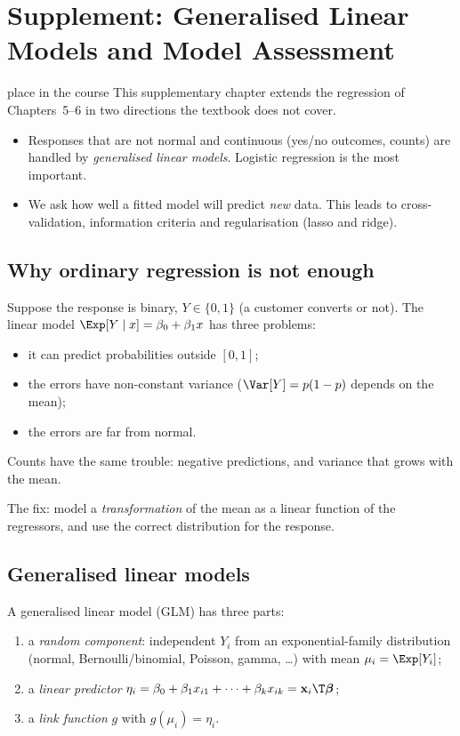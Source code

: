 \chapter{Supplement: Generalised Linear Models and Model Assessment}

\begin{nuance}{place in the course}
This supplementary chapter extends the regression of Chapters~5--6 in two directions the textbook does not cover.
\begin{itemize}
  \item Responses that are not normal and continuous (yes/no outcomes, counts) are handled by \emph{generalised linear models}. Logistic regression is the most important.
  \item We ask how well a fitted model will predict \emph{new} data. This leads to cross-validation, information criteria and regularisation (lasso and ridge).
\end{itemize}
\end{nuance}

\section{Why ordinary regression is not enough}

Suppose the response is binary, $Y\in\{0,1\}$ (a customer converts or not). The linear model $\Exp[Y\mid x]=\beta_0+\beta_1x$ has three problems:
\begin{itemize}
  \item it can predict probabilities outside $[0,1]$;
  \item the errors have non-constant variance ($\Var[Y]=p(1-p)$ depends on the mean);
  \item the errors are far from normal.
\end{itemize}
Counts have the same trouble: negative predictions, and variance that grows with the mean.

The fix: model a \emph{transformation} of the mean as a linear function of the regressors, and use the correct distribution for the response.

\section{Generalised linear models}

\begin{definition}
A generalised linear model (GLM) has three parts:
\begin{enumerate}[label=(\arabic*)]
  \item a \emph{random component}: independent $Y_i$ from an exponential-family distribution (normal, Bernoulli/binomial, Poisson, gamma, \dots) with mean $\mu_i=\Exp[Y_i]$;
  \item a \emph{linear predictor} $\eta_i=\beta_0+\beta_1x_{i1}+\dots+\beta_kx_{ik}=\mathbf{x}_i\T\boldsymbol\beta$;
  \item a \emph{link function} $g$ with $g(\mu_i)=\eta_i$.
\end{enumerate}
\end{definition}

